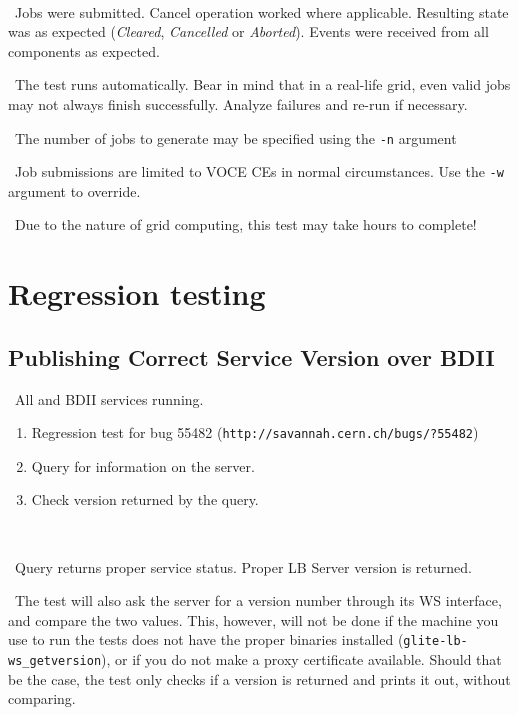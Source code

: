 \how\ 

\result\ Jobs were submitted. Cancel operation worked where applicable. Resulting state was as expected (\emph{Cleared}, \emph{Cancelled} or \emph{Aborted}). Events were received from all components as expected.

\note\ The test runs automatically. Bear in mind that in a real-life grid, even valid jobs may not always finish successfully. Analyze failures and re-run if necessary.

\note\ The number of jobs to generate may be specified using the \texttt{-n} argument

\note\ Job submissions are limited to VOCE CEs in normal circumstances. Use the \texttt{-w} argument to override. 

\note\ Due to the nature of grid computing, this test may take hours to complete!  



\section{Regression testing}

\subsection{Publishing Correct Service Version over BDII}
\req\ All \LB and BDII services running.

\what
\begin{enumerate}
\item Regression test for bug 55482 (\texttt{http://savannah.cern.ch/bugs/?55482})
\item Query for information on the server.
\item Check version returned by the query.
\end{enumerate}

\how\ 

\result\ Query returns proper service status. Proper LB Server version is returned.

\note\ The test will also ask the \LB server for a version number through its WS interface, and compare the two values. This, however, will not be done if the machine you use to run the tests does not have the proper binaries installed (\texttt{glite-lb-ws\_getversion}), or if you do not make a proxy certificate available. Should that be the case, the test only checks if a version is returned and prints it out, without comparing.

